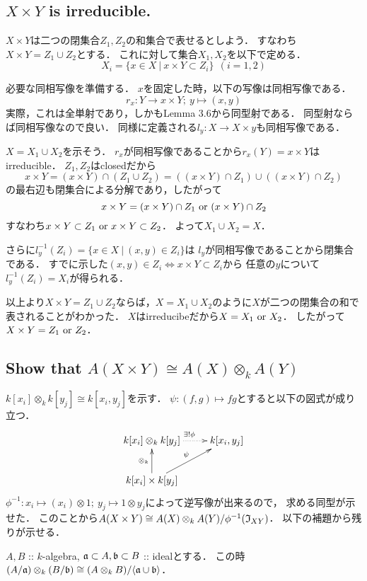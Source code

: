\documentclass[a4paper]{jsarticle}
\begin{document}
    \subsection{$X \times Y$ is irreducible.}
    $X \times Y$は二つの閉集合$Z_1, Z_2$の和集合で表せるとしよう．
    すなわち$X \times Y=Z_1 \cup Z_2$とする．
    これに対して集合$X_1, X_2$を以下で定める．
    \[ X_i=\{ x \in X ~|~ x \times Y \subset Z_i \} ~~(i=1,2) \]

    必要な同相写像を準備する．
    $x$を固定した時，以下の写像は同相写像である．
    \[ r_x: Y \to x \times Y;~ y \mapsto (x,y) \]
    実際，これは全単射であり，しかもLemma 3.6から同型射である．
    同型射ならば同相写像なので良い．
    同様に定義される$l_y:X \to X \times y$も同相写像である．

    $X=X_1 \cup X_2$を示そう．
    $r_x$が同相写像であることから$r_x(Y)=x \times Y$はirreducible．
    $Z_1, Z_2$はclosedだから
    \[ x \times Y=(x \times Y) \cap (Z_1 \cup Z_2)=((x \times Y) \cap Z_1) \cup ((x \times Y) \cap Z_2) \]
    の最右辺も閉集合による分解であり，したがって
    \[ x \times Y=(x \times Y) \cap Z_1 \text{ or } (x \times Y) \cap Z_2  \]
    すなわち$x \times Y \subset Z_1 \text{ or } x \times Y \subset Z_2$．
    よって$X_1 \cup X_2=X$．

    さらに$l_y^{-1}(Z_i)=\{ x \in X ~|~ (x,y) \in Z_i\}$は
    $l_y$が同相写像であることから閉集合である．
    すでに示した$(x,y) \in Z_i \iff x \times Y \subset Z_i$から
    任意の$y$について$l_y^{-1}(Z_i)=X_i$が得られる．
    
    以上より$X \times Y=Z_1 \cup Z_2$ならば，$X=X_1 \cup X_2$のように$X$が二つの閉集合の和で表されることがわかった．
    $X$はirreducibeだから$X=X_1 \text{ or } X_2$．
    したがって$X \times Y=Z_1 \text{ or } Z_2$．

    \subsection{Show that $A(X \times Y) \cong A(X) \otimes_k A(Y)$}
    $k[x_i] \otimes_k k[y_j] \cong k[x_i,y_j]$を示す．
    $\psi: (f,g) \mapsto fg$とすると以下の図式が成り立つ．
    \[
        \xymatrix
        {
        k[x_i] \otimes_k k[y_j] \ar@{..>}[r]^{\exists ! \phi} & k[x_i,y_j]\\
        k[x_i] \times k[y_j] \ar[u]^{\otimes_k} \ar[ur]^{\psi}
        }
    \]
    $\phi^{-1}: x_i \mapsto (x_i) \otimes 1;~ y_j \mapsto 1 \otimes y_j$によって逆写像が出来るので，
    求める同型が示せた．
    このことから$A(X \times Y) \cong A(X) \otimes_k A(Y)/\phi^{-1}(\mathfrak{I}_{XY})$．
    以下の補題から残りが示せる．
    \begin{Lemma}
        $A,B$ :: $k$-algebra, $\mathfrak{a} \subset A, \mathfrak{b} \subset B$ :: idealとする．
        この時$(A/\mathfrak{a}) \otimes_k (B/\mathfrak{b}) \cong (A \otimes_k B)/\langle \mathfrak{a} \cup \mathfrak{b} \rangle$．
    \end{Lemma}
\end{document}
